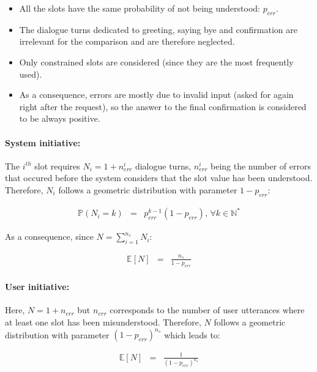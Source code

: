 		\begin{itemize}
			\item All the slots have the same probability of not being understood: $p_{err}$.
			\item The dialogue turns dedicated to greeting, saying bye and confirmation are irrelevant for the comparison and are therefore neglected.
			\item Only constrained slots are considered (since they are the most frequently used).
			\item As a consequence, errors are mostly due to invalid input (asked for again right after the request), so the answer to the final confirmation is considered to be always positive.
		\end{itemize}

                \paragraph{System initiative:} The $i^{th}$ slot requires $N_i = 1 + n^i_{err}$ dialogue turns, $n^i_{err}$ being the number of errors that occured before the system considers that the slot value has been understood. Therefore, $N_i$ follows a geometric distribution with parameter $1-p_{err}$:

                     \begin{eqnarray}
                       \mathbb{P} (N_i = k) & = & p_{err}^{k-1} (1-p_{err}) \text{,  } \forall k \in \mathbb{N}^*
                     \end{eqnarray}

                     As a consequence, since $N = \sum_{i=1}^{n_s} N_i$:

                     \begin{eqnarray}
                       \mathbb{E} [N] & = & \frac{n_s}{1-p_{err}}
                     \end{eqnarray}

                \paragraph{User initiative:} Here, $N = 1 + n_{err}$  but $n_{err}$ corresponds to the number of user utterances where at least one slot has been misunderstood. Therefore, $N$ follows a geometric distribution with parameter $(1-p_{err})^{n_s}$ which leads to:

                     \begin{eqnarray}
                       \mathbb{E} [N] & = & \frac{1}{(1-p_{err})^{n_s}}
                     \end{eqnarray}

